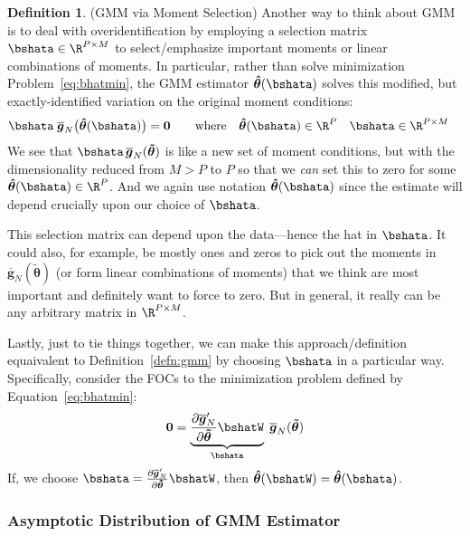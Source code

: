 \documentclass[12pt]{article}
\theoremstyle{plain}
\theoremstyle{definition}
\newtheorem{defn}[thm]{Definition}
\theoremstyle{remark}
\newcommand{\bshattheta}{\boldsymbol{\hat{\theta}}}
\newcommand{\bstildetheta}{\boldsymbol{\tilde{\theta}}}
\newcommand{\bsbarg}{\boldsymbol{\overline{g}}}
\renewcommand{\bso}{\boldsymbol{0}}
\begin{document}
\begin{defn}(GMM via Moment Selection)
Another way to think about GMM is to deal with overidentification by
employing a selection matrix $\bshata\in \R^{P\times M}$ to
select/emphasize important moments or linear combinations of moments.
In particular, rather than solve minimization Problem~\ref{eq:bhatmin},
the GMM estimator $\bshattheta(\bshata)$ solves this modified, but
exactly-identified variation on the original moment conditions:
\begin{align}
  \bshata \; \bsbarg_N\big(\bshattheta(\bshata)\big) &= \bso
  \qquad\text{where}\quad
  \bshattheta(\bshata) \in\R^P\quad \bshata \in \R^{P\times M}
  \label{eq:bhatmina}
\end{align}
We see that $\bshata\,\bsbarg_N(\bstildetheta)$ is like a new set of moment
conditions, but with the dimensionality reduced from $M>P$ to $P$ so
that we \emph{can} set this to zero for some
$\bshattheta(\bshata)\in\R^P$. And we again use notation
$\bshattheta(\bshata)$ since the estimate will depend crucially upon our
choice of $\bshata$.

This selection matrix can depend upon the data---hence the hat in
$\bshata$. It could also, for example, be mostly ones and zeros to pick
out the moments in $\bsbarg_N(\bstildetheta)$ (or form linear combinations
of moments) that we think are most important and definitely want to
force to zero. But in general, it really can be any arbitrary matrix in
$\R^{P\times M}$.

Lastly, just to tie things together, we can make this
approach/definition equaivalent to Definition~\ref{defn:gmm} by choosing
$\bshata$ in a particular way. Specifically, consider the FOCs to the
minimization problem defined by Equation~\ref{eq:bhatmin}:
\begin{align}
  \bso
  =
  \underbrace{\frac{\partial \bsbarg_N'}{\partial \bstildetheta} \bshatW}_{\bshata}
  \;\bsbarg_N(\bstildetheta)
  \label{eq:equivrep}
\end{align}
If, we choose
$\bshata=\frac{\partial \bsbarg_N'}{\partial \bstildetheta} \bshatW$,
then $\bshattheta(\bshatW)=\bshattheta(\bshata)$.
\end{defn}


\clearpage
\subsubsection{Asymptotic Distribution of GMM Estimator}
\end{document}
